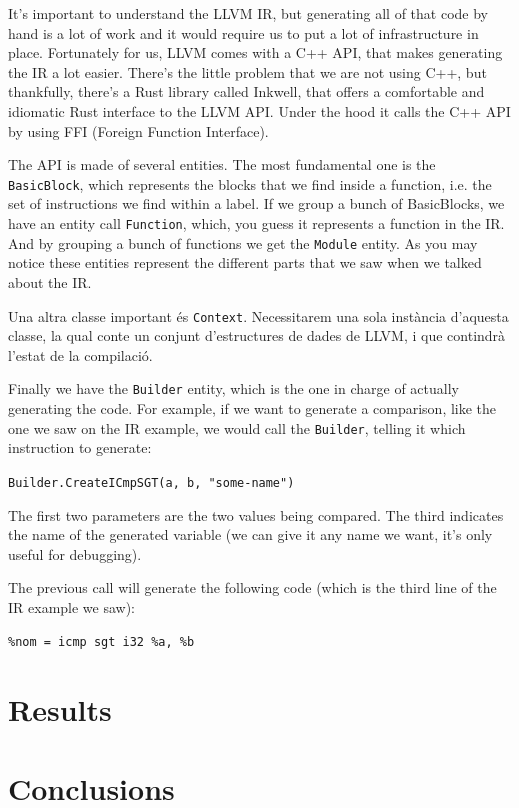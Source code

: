 ﻿\documentclass[10pt,a4paper,twocolumn,twoside]{article}
\begin{document}
It's important to understand the LLVM IR, but generating all of that code by 
hand is a lot of work and it would require us to put a lot of infrastructure in
place. Fortunately for us, LLVM comes with a C++ API, that makes generating the
IR a lot easier. There's the little problem that we are not using C++, but 
thankfully, there's a Rust library called Inkwell, that offers a comfortable and 
idiomatic Rust interface to the LLVM API. Under the hood it calls the C++ API
by using FFI (Foreign Function Interface).

The API is made of several entities. The most fundamental one is the
\texttt{BasicBlock}, which represents the blocks that we find inside a function,
i.e. the set of instructions we find within a label. If we group a bunch of
BasicBlocks, we have an entity call \texttt{Function}, which, you guess it 
represents a function in the IR. And by grouping a bunch of functions we get the
\texttt{Module} entity. As you may notice these entities represent the different
parts that we saw when we talked about the IR.

Una altra classe important és \texttt{Context}. Necessitarem una sola instància
d'aquesta classe, la qual conte un conjunt d'estructures de dades de LLVM, i que
contindrà l'estat de la compilació.

Finally we have the \texttt{Builder} entity, which is the one in charge of 
actually generating the code. For example, if we want to generate a comparison,
like the one we saw on the IR example, we would call the \texttt{Builder}, 
telling it which instruction to generate:

\texttt{Builder.CreateICmpSGT(a, b, "some-name")}

The first two parameters are the two values being compared. The third 
indicates the name of the generated variable (we can give it any name we want,
it's only useful for debugging).

The previous call will generate the following code (which is the third line of
the IR example we saw):

\texttt{\%nom = icmp sgt i32 \%a, \%b}

\section{Results}
\section{Conclusions}
\end{document}
